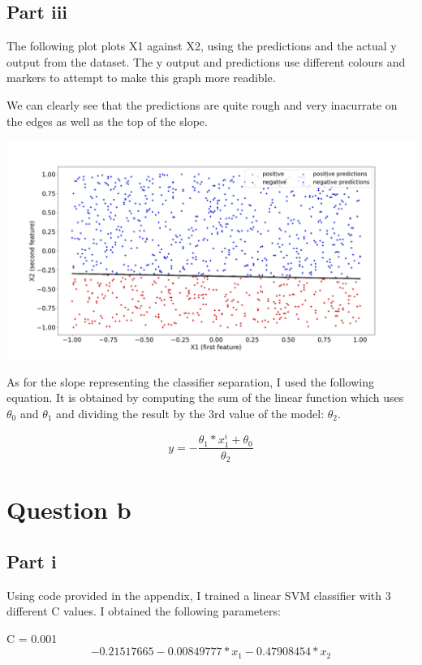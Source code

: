 \documentclass[10pt]{article}
\begin{document}
\subsection*{Part iii}
The following plot plots X1 against X2, using the predictions and
the actual y output from the dataset.
The y output and predictions use different colours and markers to attempt to make
this graph more readible.


We can clearly see that the predictions
are quite rough and very inacurrate on the edges as well as the top of the
slope.

\includegraphics[scale=0.245]{Figure_2.png}

As for the slope representing the classifier separation, I used the
following equation. It is obtained by computing the sum of the linear function
which uses $\theta_{0}$ and $\theta_{1}$ and dividing the result
by the 3rd value of the model: $\theta_{2}$.

\begin{equation*}
    y = -\frac{\theta_{1} * x_{1}^{i} + \theta_{0}}{\theta_{2}}
\end{equation*}

\section*{Question b}
\subsection*{Part i}
Using code provided in the appendix, I trained a linear SVM
classifier with 3 different C values. I obtained the following parameters:

C = 0.001
\begin{equation*}
    -0.21517665 - 0.00849777 * x_{1} - 0.47908454 * x_{2}
\end{equation*}
\end{document}

